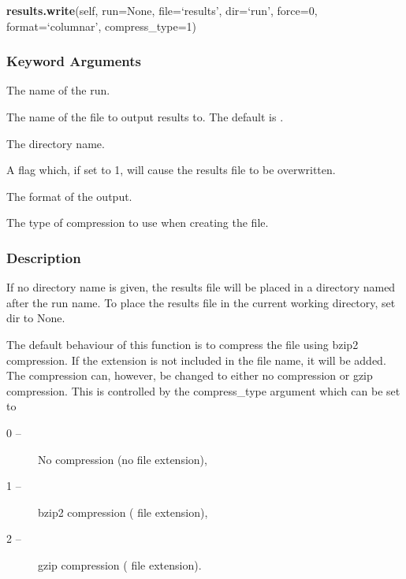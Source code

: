 \textsf{\textbf{results.write}(self, run=None, file=`results', dir=`run', force=0, format=`columnar', compress\_type=1)}


\subsubsection{Keyword Arguments}


  The name of the run.

  The name of the file to output results to.  The default is 
.

  The directory name.

  A flag which, if set to 1, will cause the results file to be overwritten.

  The format of the output.

  The type of compression  to use when creating the file.

\subsubsection{Description}

If no directory name is given, the results file will be placed in a directory named after
the run name.  To place the results file in the current working directory, set dir to None.

The default behaviour of this function is to compress the file using bzip2  compression.   If
the extension 
 is not included in the file name, it will be added.  The compression 
can, however, be changed to either no compression  or gzip  compression.   This is controlled
by the compress\_type argument which can be set to

\begin{description}
\item[    0 --]   No compression  (no file extension),
\item[    1 --]   bzip2  compression  (
 file extension),
\item[    2 --]   gzip  compression  (
 file extension).
\end{description}

